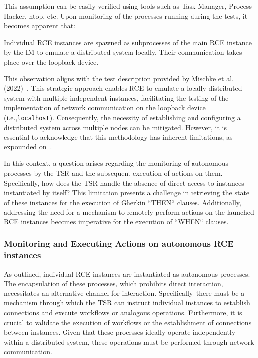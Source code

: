 This assumption can be easily verified using tools such as Task Manager, Process Hacker, htop, etc. Upon monitoring of the processes running during the tests, it becomes apparent that:

\begin{observation}
Individual \ac{RCE} instances are spawned as subprocesses of the main \ac{RCE} instance by the \acl{IM} to emulate a distributed system locally. Their communication takes place over the loopback device.
\end{observation}

This observation aligns with the test description provided by Mischke et al. (2022)~\cite{10.1007/978-3-031-08760-8_44}. This strategic approach enables \ac{RCE} to emulate a locally distributed system with multiple independent instances, facilitating the testing of the implementation of network communication on the loopback device (i.e.,\texttt{localhost}). Consequently, the necessity of establishing and configuring a distributed system across multiple nodes can be mitigated. However, it is essential to acknowledge that this methodology has inherent limitations, as expounded on~.

In this context, a question arises regarding the monitoring of autonomous processes by the \ac{TSR} and the subsequent execution of actions on them. Specifically, how does the \ac{TSR} handle the absence of direct access to instances instantiated by itself? This limitation presents a challenge in retrieving the state of these instances for the execution of Gherkin ``THEN`` clauses. Additionally, addressing the need for a mechanism to remotely perform actions on the launched RCE instances becomes imperative for the execution of ``WHEN`` clauses.

\subsubsection{Monitoring and Executing Actions on autonomous RCE instances}
As outlined, individual RCE instances are instantiated as autonomous processes. The encapsulation of these processes, which prohibits direct interaction, necessitates an alternative channel for interaction. Specifically, there must be a mechanism through which the \ac{TSR} can instruct individual instances to establish connections and execute workflows or analogous operations. Furthermore, it is crucial to validate the execution of workflows or the establishment of connections between instances. Given that these processes ideally operate independently within a distributed system, these operations must be performed through network communication.

